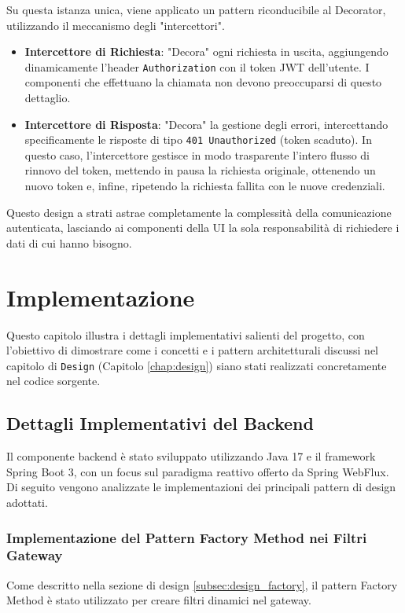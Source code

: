 \documentclass[12pt,a4paper,openright,twoside]{book}
\begin{document}
Su questa istanza unica, viene applicato un pattern riconducibile al Decorator, utilizzando il meccanismo degli "intercettori".
\begin{itemize}
    \item \textbf{Intercettore di Richiesta}: "Decora" ogni richiesta in uscita, aggiungendo dinamicamente l'header \texttt{Authorization} con il token JWT dell'utente. I componenti che effettuano la chiamata non devono preoccuparsi di questo dettaglio.
    \item \textbf{Intercettore di Risposta}: "Decora" la gestione degli errori, intercettando specificamente le risposte di tipo \texttt{401 Unauthorized} (token scaduto). In questo caso, l'intercettore gestisce in modo trasparente l'intero flusso di rinnovo del token, mettendo in pausa la richiesta originale, ottenendo un nuovo token e, infine, ripetendo la richiesta fallita con le nuove credenziali.
\end{itemize}
Questo design a strati astrae completamente la complessità della comunicazione autenticata, lasciando ai componenti della UI la sola responsabilità di richiedere i dati di cui hanno bisogno.

\chapter{Implementazione}
\label{chap:implementazione}

Questo capitolo illustra i dettagli implementativi salienti del progetto, con l'obiettivo di dimostrare come i concetti e i pattern architetturali discussi nel capitolo di \texttt{Design} (Capitolo \ref{chap:design}) siano stati realizzati concretamente nel codice sorgente. 

\section{Dettagli Implementativi del Backend}
\label{sec:impl_backend}
Il componente backend è stato sviluppato utilizzando Java 17 e il framework Spring Boot 3, con un focus sul paradigma reattivo offerto da Spring WebFlux. Di seguito vengono analizzate le implementazioni dei principali pattern di design adottati.

\subsection{Implementazione del Pattern Factory Method nei Filtri Gateway}
\label{subsec:impl_factory}
Come descritto nella sezione di design \ref{subsec:design_factory}, il pattern Factory Method è stato utilizzato per creare filtri dinamici nel gateway.
\end{document}
